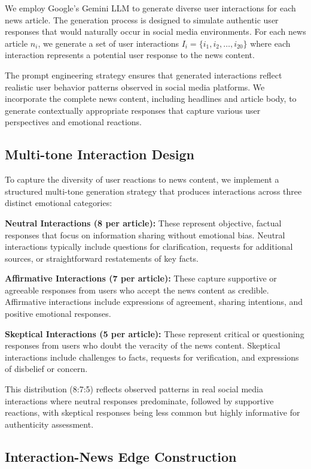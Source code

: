 We employ Google's Gemini LLM to generate diverse user interactions for each news article. The generation process is designed to simulate authentic user responses that would naturally occur in social media environments. For each news article $n_i$, we generate a set of user interactions $I_i = \{i_1, i_2, \ldots, i_{20}\}$ where each interaction represents a potential user response to the news content.

The prompt engineering strategy ensures that generated interactions reflect realistic user behavior patterns observed in social media platforms. We incorporate the complete news content, including headlines and article body, to generate contextually appropriate responses that capture various user perspectives and emotional reactions.

\subsection{Multi-tone Interaction Design}

To capture the diversity of user reactions to news content, we implement a structured multi-tone generation strategy that produces interactions across three distinct emotional categories:

\textbf{Neutral Interactions (8 per article):} These represent objective, factual responses that focus on information sharing without emotional bias. Neutral interactions typically include questions for clarification, requests for additional sources, or straightforward restatements of key facts.

\textbf{Affirmative Interactions (7 per article):} These capture supportive or agreeable responses from users who accept the news content as credible. Affirmative interactions include expressions of agreement, sharing intentions, and positive emotional responses.

\textbf{Skeptical Interactions (5 per article):} These represent critical or questioning responses from users who doubt the veracity of the news content. Skeptical interactions include challenges to facts, requests for verification, and expressions of disbelief or concern.

This distribution (8:7:5) reflects observed patterns in real social media interactions where neutral responses predominate, followed by supportive reactions, with skeptical responses being less common but highly informative for authenticity assessment.

\subsection{Interaction-News Edge Construction}

